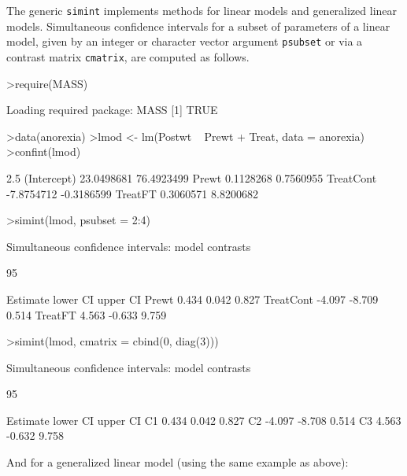 \documentclass{article}
\begin{document}
The generic \texttt{simint} implements methods for linear models and
generalized linear models. Simultaneous confidence intervals for a subset
of parameters of a linear model, given by an integer or character vector
argument \texttt{psubset} or via a contrast matrix \texttt{cmatrix}, 
are computed as follows.
\small
\begin{Schunk}
\begin{Sinput}
>require(MASS)
\end{Sinput}
\begin{Soutput}
Loading required package: MASS 
[1] TRUE
\end{Soutput}
\begin{Sinput}
>data(anorexia)
>lmod <- lm(Postwt ~ Prewt + Treat, data = anorexia)
>confint(lmod)
\end{Sinput}
\begin{Soutput}
                 2.5 %     97.5 %
(Intercept) 23.0498681 76.4923499
Prewt        0.1128268  0.7560955
TreatCont   -7.8754712 -0.3186599
TreatFT      0.3060571  8.8200682
\end{Soutput}
\begin{Sinput}
>simint(lmod, psubset = 2:4)
\end{Sinput}
\begin{Soutput}
	Simultaneous confidence intervals: model contrasts

	95 % confidence intervals

          Estimate lower CI upper CI
Prewt        0.434    0.042    0.827
TreatCont   -4.097   -8.709    0.514
TreatFT      4.563   -0.633    9.759
\end{Soutput}
\begin{Sinput}
>simint(lmod, cmatrix = cbind(0, diag(3)))
\end{Sinput}
\begin{Soutput}
	Simultaneous confidence intervals: model contrasts

	95 % confidence intervals

   Estimate lower CI upper CI
C1    0.434    0.042    0.827
C2   -4.097   -8.708    0.514
C3    4.563   -0.632    9.758
\end{Soutput}
\end{Schunk}
\normalsize
And for a generalized linear model (using the same example as above):
\small
\end{document}
